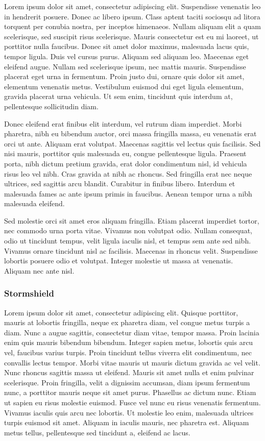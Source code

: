 \documentclass{report}
\begin{document}
Lorem ipsum dolor sit amet, consectetur adipiscing elit. Suspendisse venenatis leo in hendrerit posuere. Donec ac libero ipsum. Class aptent taciti sociosqu ad litora torquent per conubia nostra, per inceptos himenaeos. Nullam aliquam elit a quam scelerisque, sed suscipit risus scelerisque. Mauris consectetur est eu mi laoreet, ut porttitor nulla faucibus. Donec sit amet dolor maximus, malesuada lacus quis, tempor ligula. Duis vel cursus purus. Aliquam sed aliquam leo. Maecenas eget eleifend augue. Nullam sed scelerisque ipsum, nec mattis mauris. Suspendisse placerat eget urna in fermentum. Proin justo dui, ornare quis dolor sit amet, elementum venenatis metus. Vestibulum euismod dui eget ligula elementum, gravida placerat urna vehicula. Ut sem enim, tincidunt quis interdum at, pellentesque sollicitudin diam.

Donec eleifend erat finibus elit interdum, vel rutrum diam imperdiet. Morbi pharetra, nibh eu bibendum auctor, orci massa fringilla massa, eu venenatis erat orci ut ante. Aliquam erat volutpat. Maecenas sagittis vel lectus quis facilisis. Sed nisi mauris, porttitor quis malesuada eu, congue pellentesque ligula. Praesent porta, nibh dictum pretium gravida, erat dolor condimentum nisl, id vehicula risus leo vel nibh. Cras gravida at nibh ac rhoncus. Sed fringilla erat nec neque ultrices, sed sagittis arcu blandit. Curabitur in finibus libero. Interdum et malesuada fames ac ante ipsum primis in faucibus. Aenean tempor urna a nibh malesuada eleifend.

Sed molestie orci sit amet eros aliquam fringilla. Etiam placerat imperdiet tortor, nec commodo urna porta vitae. Vivamus non volutpat odio. Nullam consequat, odio ut tincidunt tempus, velit ligula iaculis nisl, et tempus sem ante sed nibh. Vivamus ornare tincidunt nisl ac facilisis. Maecenas in rhoncus velit. Suspendisse lobortis posuere odio et volutpat. Integer molestie ut massa at venenatis. Aliquam nec ante nisl.

\subsubsection{Stormshield}

Lorem ipsum dolor sit amet, consectetur adipiscing elit. Quisque porttitor, mauris at lobortis fringilla, neque ex pharetra diam, vel congue metus turpis a diam. Nunc a augue sagittis, consectetur diam vitae, tempor massa. Proin lacinia enim quis mauris bibendum bibendum. Integer sapien metus, lobortis quis arcu vel, faucibus varius turpis. Proin tincidunt tellus viverra elit condimentum, nec convallis lectus tempor. Morbi vitae mauris ut mauris dictum gravida ac vel velit. Nunc rhoncus sagittis massa ut eleifend. Mauris sit amet nulla et enim pulvinar scelerisque. Proin fringilla, velit a dignissim accumsan, diam ipsum fermentum nunc, a porttitor mauris neque sit amet purus. Phasellus ac dictum nunc. Etiam ut sapien eu risus molestie euismod. Fusce vel nunc eu risus venenatis fermentum. Vivamus iaculis quis arcu nec lobortis. Ut molestie leo enim, malesuada ultrices turpis euismod sit amet. Aliquam in iaculis mauris, nec pharetra est. Aliquam metus tellus, pellentesque sed tincidunt a, eleifend ac lacus.
\end{document}
